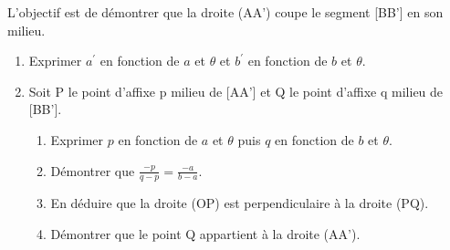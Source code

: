 \begin{center}
\end{center}
L'objectif est de démontrer que la droite (AA') coupe le segment [BB'] en son milieu.
\begin{enumerate}
     \item
     Exprimer $a^{\prime}$ en fonction de $a$ et $\theta $ et $b^{\prime}$ en fonction de $b$ et $\theta $.
     \item
     Soit P le point d'affixe p milieu de [AA'] et Q le point d'affixe q milieu de [BB'].
     \begin{enumerate}[label=\alph*.]
          \item
          Exprimer $p$ en fonction de $a$ et $\theta $ puis $q$ en fonction de $b$ et $\theta $.
          \item
          Démontrer que $\frac{-p}{q-p}=\frac{- a}{b-a}$.
          \item
          En déduire que la droite (OP) est perpendiculaire à la droite (PQ).
          \item
          Démontrer que le point Q appartient à la droite (AA').
     \end{enumerate}
\end{enumerate}
